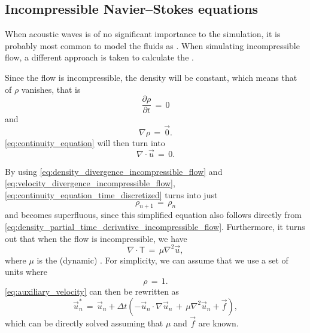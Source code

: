 \subsection{Incompressible Navier--Stokes equations}

When acoustic waves is of no significant importance to the simulation, it is probably most common to model the fluids as \incompressible. When simulating incompressible flow, a different approach is taken to calculate the .

Since the flow is incompressible, the density will be constant, which means that \derivatives of $\rho$ vanishes, that is
%
\begin{equation} \label{eq:density_partial_time_derivative_incompressible_flow}
\frac{\partial \rho}{\partial t} \,=\, 0
\end{equation}
%
and
%
\begin{equation} \label{eq:density_divergence_incompressible_flow}
\nabla\rho \,=\, \vec{0}.
\end{equation}
%
\eqref{eq:continuity_equation} will then turn into
%
\begin{equation} \label{eq:velocity_divergence_incompressible_flow}
\nabla\cdot\vec{u} \,=\, 0.
\end{equation}

By using \eqref{eq:density_divergence_incompressible_flow} and \eqref{eq:velocity_divergence_incompressible_flow}, \eqref{eq:continuity_equation_time_discretized} turns into just
%
\begin{equation} \label{eq:continuity_equation_superfluous}
{\rho_{n+1} \,=\, \rho_n}
\end{equation}
%
and becomes superfluous, since this simplified equation also follows directly from \eqref{eq:density_partial_time_derivative_incompressible_flow}. Furthermore, it turns out that when the flow is incompressible, we have
%
\begin{equation} \label{eq:deviatoric_stress_tensor_incompressible_flow}
\nabla\cdot\boldsymbol{\mathsf{T}} \,=\, \mu\nabla^2\vec{u},
\end{equation}
%
where $\mu$ is the (dynamic) \viscosity \citep{Batchelor1967}. For simplicity, we can assume that we use a set of units where
%
\begin{equation} \label{eq:rho_is_one}
\rho \,=\, 1.
\end{equation}
%
\eqref{eq:auxiliary_velocity} can then be rewritten as
%
\begin{equation} \label{eq:auxiliary_velocity_reduced}
\vec{u}^*_n \,= \, \vec{u}_{n} + \Delta t(- \vec{u}_{n}\cdot\nabla\vec{u}_{n} \,+\, \mu\nabla^2\vec{u}_{n} + \vec{f}),
\end{equation}
%
which can be directly solved assuming that $\mu$ and $\vec{f}$ are known.

